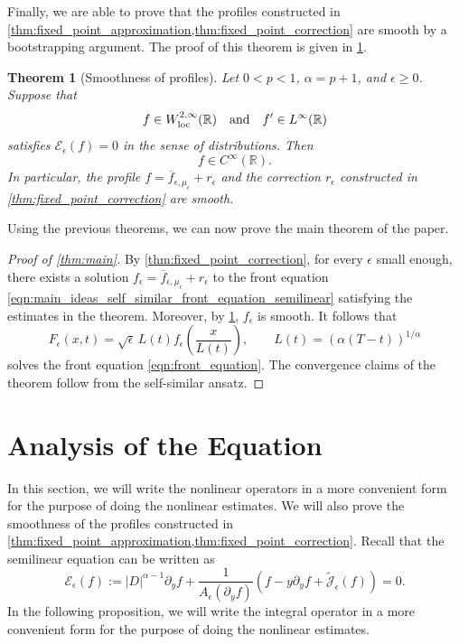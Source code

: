 \documentclass[11pt]{amsart}
\newtheorem{theorem}{Theorem}[section]
\theoremstyle{definition}
\theoremstyle{remark}
\numberwithin{equation}{section}
\newcommand{\sq}[1]{\widetilde{#1}}
\newcommand{\R}{\mathbb{R}}
\newcommand{\mc}[1]{\mathcal{#1}}
\newcommand{\ov}[1]{\overline{#1}}
\begin{document}
Finally, we are able to prove that the profiles constructed in \cref{thm:fixed_point_approximation,thm:fixed_point_correction} are smooth by a bootstrapping argument. The proof of this theorem is given in \cref{sec:analysis_equation}.

\begin{theorem}[Smoothness of profiles]\label{thm:fixed_point_smoothness}
    Let $0<p<1$, $\alpha=p+1$, and $\epsilon\geq0$. Suppose that
    \[f\in W^{2,\infty}_{\textup{loc}}(\R) \quad \text{and} \quad f'\in L^\infty(\R)\]
    satisfies $\mc{E}_\epsilon(f)=0$ in the sense of distributions. Then
    \[f \in C^\infty(\R).\] 
    In particular, the profile
    $f=\ov{f}_{\epsilon,\mu_\epsilon}+r_\epsilon$ and the correction
    $r_\epsilon$ constructed in \cref{thm:fixed_point_correction} are smooth.
\end{theorem}

Using the previous theorems, we can now prove the main theorem of the paper.

\begin{proof}[Proof of \cref{thm:main}]
    By \cref{thm:fixed_point_correction}, for every $\epsilon$ small enough, there exists a solution $f_\epsilon = \ov{f}_{\epsilon, \mu_\epsilon} + r_\epsilon$ to the front equation \eqref{eqn:main_ideas_self_similar_front_equation_semilinear} satisfying the estimates in the theorem. Moreover, by \cref{thm:fixed_point_smoothness}, $f_\epsilon$ is smooth. It follows that 
    \[F_\epsilon(x, t) = \sqrt{\epsilon}\,L(t)f_\epsilon\left(\frac{x}{L(t)}\right), \qquad L(t) = (\alpha(T-t))^{1/\alpha}\]
    solves the front equation \eqref{eqn:front_equation}. The convergence claims of the theorem follow from the self-similar ansatz.
\end{proof}

\section{Analysis of the Equation}\label{sec:analysis_equation}

In this section, we will write the nonlinear operators in a more convenient form for the purpose of doing the nonlinear estimates. We will also prove the smoothness of the profiles constructed in \cref{thm:fixed_point_approximation,thm:fixed_point_correction}. Recall that the semilinear equation can be written as
\[\mc{E}_\epsilon(f) := |D|^{\alpha - 1}\partial_y f + \frac{1}{A_\epsilon(\partial_y f)}\left(f - y\partial_yf + \sq{\mc{J}}_\epsilon(f)\right) = 0.\]
In the following proposition, we will write the integral operator in a more convenient form for the purpose of doing the nonlinear estimates.
\end{document}
